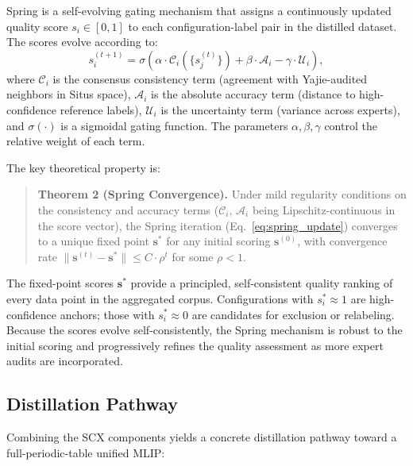 \documentclass[twoside,prb,aps,floatfix,superscriptaddress,longbibliography]{revtex4-2}
\begin{document}
Spring is a self-evolving gating mechanism that assigns a continuously updated quality score $s_i \in [0, 1]$ to each configuration-label pair in the distilled dataset. The scores evolve according to:
\begin{equation}
s_i^{(t+1)} = \sigma\!\left( \alpha \cdot \mathcal{C}_i(\{s_j^{(t)}\}) + \beta \cdot \mathcal{A}_i - \gamma \cdot \mathcal{U}_i \right),
\label{eq:spring_update}
\end{equation}
where $\mathcal{C}_i$ is the consensus consistency term (agreement with Yajie-audited neighbors in Situs space), $\mathcal{A}_i$ is the absolute accuracy term (distance to high-confidence reference labels), $\mathcal{U}_i$ is the uncertainty term (variance across experts), and $\sigma(\cdot)$ is a sigmoidal gating function. The parameters $\alpha, \beta, \gamma$ control the relative weight of each term.

The key theoretical property is:

\begin{quote}
\textbf{Theorem 2 (Spring Convergence).} Under mild regularity conditions on the consistency and accuracy terms ($\mathcal{C}_i$, $\mathcal{A}_i$ being Lipschitz-continuous in the score vector), the Spring iteration (Eq.~\ref{eq:spring_update}) converges to a unique fixed point $\mathbf{s}^*$ for any initial scoring $\mathbf{s}^{(0)}$, with convergence rate $\| \mathbf{s}^{(t)} - \mathbf{s}^* \| \le C \cdot \rho^t$ for some $\rho < 1$.
\end{quote}

The fixed-point scores $\mathbf{s}^*$ provide a principled, self-consistent quality ranking of every data point in the aggregated corpus. Configurations with $s_i^* \approx 1$ are high-confidence anchors; those with $s_i^* \approx 0$ are candidates for exclusion or relabeling. Because the scores evolve self-consistently, the Spring mechanism is robust to the initial scoring and progressively refines the quality assessment as more expert audits are incorporated.

\subsection{Distillation Pathway}

Combining the SCX components yields a concrete distillation pathway toward a full-periodic-table unified MLIP:
\end{document}
